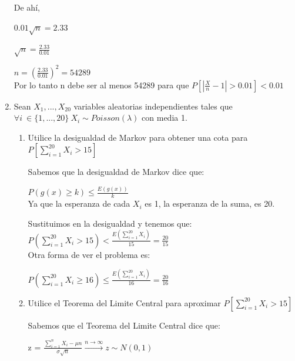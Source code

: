 \documentclass[11pt,a4paper]{report}
\begin{document}
\begin{enumerate}
{        De ahí, 
        
        $0.01\sqrt{n} = 2.33$
        
        $\sqrt{n} = \frac{2.33}{0.01}$
        
        $n = (\frac{2.33}{0.01}) ^ 2 = 54289$\\
        
        Por lo tanto n debe ser al menos 54289 para que $P[|\frac{X}{n}-1| > 0.01] < 0.01$\\

		}

		\item{
			Sean $X_{1},...,X_{20}$ variables aleatorias independientes tales que $\forall i \ \in \lbrace 1,...,20 \rbrace \ X_{i} \sim Poisson(\lambda) $ con media 1.\\
			\begin{enumerate}
          
			    \item{Utilice la desigualdad de Markov para obtener una cota para $P[\sum_{i=1}^{20}X_{i}>15]$} 
			    
			    Sabemos que la desigualdad de Markov dice que:
			    
			    $P(g(x) \geq k) \leq \frac{E(g(x))}{k}$\\
			    
			    Ya que la esperanza de cada $X_{i}$ es 1, la esperanza de la suma, es 20.
		    
			    Sustituimos en la desigualdad y tenemos que:\\
			    
			    $P(\sum_{i=1}^{20}X_{i}>15) < \frac{E(\sum_{i=1}^{20}X_{i})}{15} = \frac{20}{15}$\\
			    
			    Otra forma de ver el problema es:
			    
			    $P(\sum_{i=1}^{20}X_{i}\geq 16) \leq \frac{E(\sum_{i=1}^{20}X_{i})}{16} = \frac{20}{16}$\\
			        
			 
			    \item{Utilice el Teorema del Limite Central para aproximar $P[\sum_{i=1}^{20}X_{i}>15]$}
			    
				Sabemos que el Teorema del Limite Central dice que:
				
 				z = $\frac{\sum_{i=1}^{n} X_{i} - \mu n }{\sigma \sqrt{n}}  \xrightarrow{n \to \infty}  z \sim N(0,1)$\\
			    

\end{enumerate}}
\end{enumerate}
\end{document}
